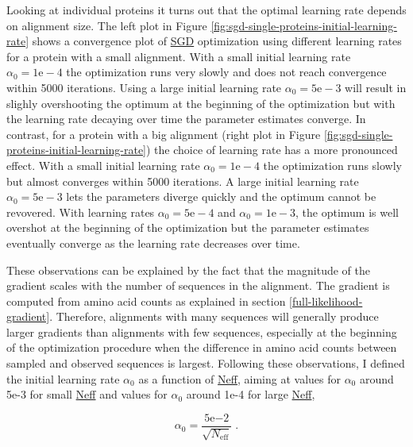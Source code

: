 \documentclass[11pt,a4paper,twoside]{book}
\newcommand{\eq}{\!=\!}
\theoremstyle{definition}
\theoremstyle{definition}
\theoremstyle{remark}
\begin{document}
Looking at individual proteins it turns out that the optimal learning
rate depends on alignment size. The left plot in Figure
\ref{fig:sgd-single-proteins-initial-learning-rate} shows a convergence
plot of \protect\hyperlink{abbrev}{SGD} optimization using different
learning rates for a protein with a small alignment. With a small
initial learning rate \(\alpha_0 \eq \mathrm{1e-4}\) the optimization
runs very slowly and does not reach convergence within 5000 iterations.
Using a large initial learning rate \(\alpha_0 \eq \mathrm{5e-3}\) will
result in slighly overshooting the optimum at the beginning of the
optimization but with the learning rate decaying over time the parameter
estimates converge. In contrast, for a protein with a big alignment
(right plot in Figure
\ref{fig:sgd-single-proteins-initial-learning-rate}) the choice of
learning rate has a more pronounced effect. With a small initial
learning rate \(\alpha_0 \eq \mathrm{1e-4}\) the optimization runs
slowly but almost converges within 5000 iterations. A large initial
learning rate \(\alpha_0 \eq \mathrm{5e-3}\) lets the parameters diverge
quickly and the optimum cannot be revovered. With learning rates
\(\alpha_0 \eq \mathrm{5e-4}\) and \(\alpha_0 \eq \mathrm{1e-3}\), the
optimum is well overshot at the beginning of the optimization but the
parameter estimates eventually converge as the learning rate decreases
over time.

These observations can be explained by the fact that the magnitude of
the gradient scales with the number of sequences in the alignment. The
gradient is computed from amino acid counts as explained in section
\ref{full-likelihood-gradient}. Therefore, alignments with many
sequences will generally produce larger gradients than alignments with
few sequences, especially at the beginning of the optimization procedure
when the difference in amino acid counts between sampled and observed
sequences is largest. Following these observations, I defined the
initial learning rate \(\alpha_0\) as a function of
\protect\hyperlink{abbrev}{Neff}, aiming at values for \(\alpha_0\)
around 5e-3 for small \protect\hyperlink{abbrev}{Neff} and values for
\(\alpha_0\) around 1e-4 for large \protect\hyperlink{abbrev}{Neff},

\begin{equation}
  \alpha_0 = \frac{5\mathrm{e}{-2}}{\sqrt{N_{\text{eff}}}} \; .
  \label{eq:learning-rate-wrt-neff}
\end{equation}
\end{document}
